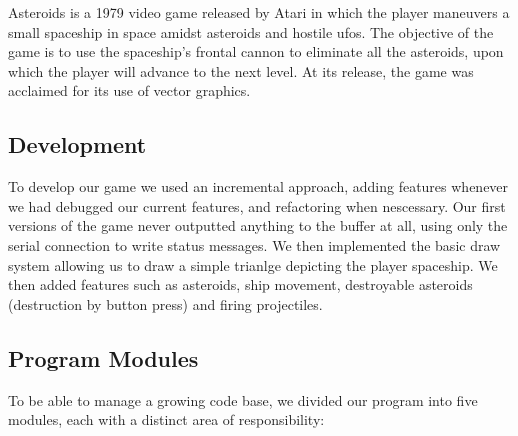 Asteroids is a 1979 video game released by Atari in which the player maneuvers a small spaceship in space amidst asteroids and hostile ufos. The objective of the game is to use the spaceship's frontal cannon to eliminate all the asteroids, upon which the player will advance to the next level. At its release, the game was acclaimed for its use of vector graphics.


\subsection{Development}
To develop our game we used an incremental approach, adding features whenever we had debugged our current features, and refactoring when nescessary. Our first versions of the game never outputted anything to the buffer at all, using only the serial connection to write status messages. We then implemented the basic draw system allowing us to draw a simple trianlge depicting the player spaceship. We then added features such as asteroids, ship movement, destroyable asteroids (destruction by button press) and firing projectiles.

\subsection{Program Modules}
To be able to manage a growing code base, we divided our program into five modules, each with a distinct area of responsibility:


